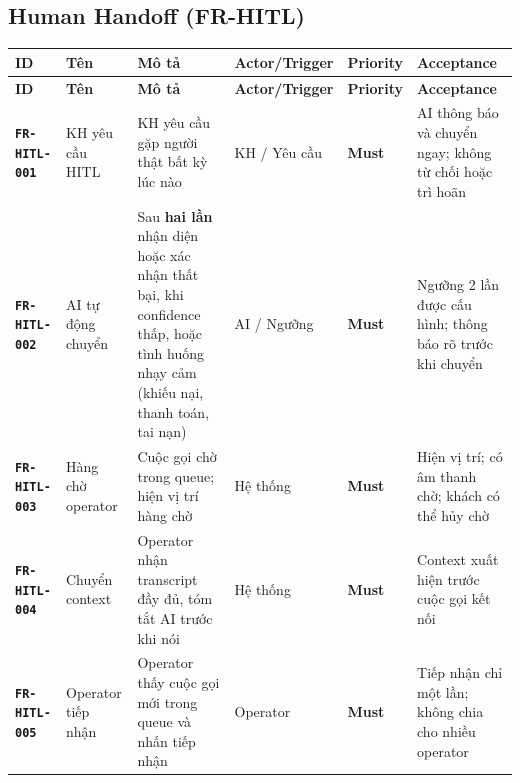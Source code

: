\documentclass[12pt,a4paper]{article}
\newcommand{\reqid}[1]{\texttt{\textbf{\color{AloBlue}#1}}}
\newcommand{\musthave}{\colorbox{PrioMust}{\small\textbf{Must}}}
\begin{document}
\subsection{Human Handoff (FR-HITL)}
\begin{longtable}{L{2.2cm} L{2.2cm} L{3.8cm} L{2.8cm} C{1.5cm} L{3cm}}
  \toprule{}\textbf{ID}&\textbf{Tên}&\textbf{Mô tả}&\textbf{Actor/Trigger}&\textbf{Priority}&\textbf{Acceptance}\\
  \midrule\endfirsthead\toprule{}\textbf{ID}&\textbf{Tên}&\textbf{Mô tả}&\textbf{Actor/Trigger}&\textbf{Priority}&\textbf{Acceptance}\\\midrule\endhead\bottomrule\endlastfoot
  \reqid{FR-HITL-001} & KH yêu cầu HITL & KH yêu cầu gặp người thật bất kỳ lúc nào & KH / Yêu cầu & \musthave & AI thông báo và chuyển ngay; không từ chối hoặc trì hoãn \\
  \reqid{FR-HITL-002} & AI tự động chuyển & Sau \textbf{hai lần} nhận diện hoặc xác nhận thất bại, khi confidence thấp, hoặc tình huống nhạy cảm (khiếu nại, thanh toán, tai nạn) & AI / Ngưỡng & \musthave & Ngưỡng 2 lần được cấu hình; thông báo rõ trước khi chuyển \\
  \reqid{FR-HITL-003} & Hàng chờ operator & Cuộc gọi chờ trong queue; hiện vị trí hàng chờ & Hệ thống & \musthave & Hiện vị trí; có âm thanh chờ; khách có thể hủy chờ \\
  \reqid{FR-HITL-004} & Chuyển context & Operator nhận transcript đầy đủ, tóm tắt AI trước khi nói & Hệ thống & \musthave & Context xuất hiện trước cuộc gọi kết nối \\
  \reqid{FR-HITL-005} & Operator tiếp nhận & Operator thấy cuộc gọi mới trong queue và nhấn tiếp nhận & Operator & \musthave & Tiếp nhận chỉ một lần; không chia cho nhiều operator \\
\end{longtable}
\end{document}
